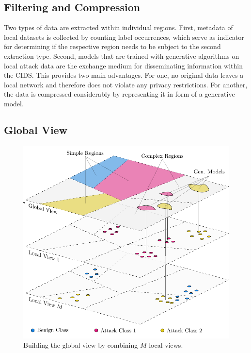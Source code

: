 \subsection{Filtering and Compression}\label{subsec:filtering_and_compression}

Two types of data are extracted within individual regions. First, metadata of local datasets is collected by counting label occurrences, which serve as indicator for determining if the respective region needs to be subject to the second extraction type. Second, models that are trained with generative algorithms on local attack data are the exchange medium for disseminating information within the CIDS. This provides two main advantages. For one, no original data leaves a local network and therefore does not violate any privacy restrictions. For another, the data is compressed considerably by representing it in form of a generative model. 

\subsection{Global View}\label{subsec:global_view}

\begin{figure}[b!]
    \centering
    \includegraphics[width=0.8\linewidth]{tikz/global_view.pdf}
    \caption{Building the global view by combining $M$ local views.}
    \label{fig:global_view}
\end{figure}

